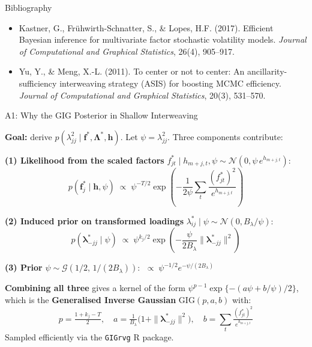 \documentclass[10pt]{beamer}\usepackage[]{graphicx}\usepackage[table]{xcolor}
\begin{document}

\appendix

\begin{frame}{Bibliography}
  \begin{itemize}
    \setlength\itemsep{1em}
    \item Kastner, G., Fr\"{u}hwirth-Schnatter, S., \& Lopes, H.F. (2017).
          Efficient Bayesian inference for multivariate factor stochastic
          volatility models. \textit{Journal of Computational and Graphical
          Statistics}, 26(4), 905--917.
    \item Yu, Y., \& Meng, X.-L. (2011). To center or not to center:
          An ancillarity-sufficiency interweaving strategy (ASIS) for
          boosting MCMC efficiency. \textit{Journal of Computational and
          Graphical Statistics}, 20(3), 531--570.
  \end{itemize}
\end{frame}


\begin{frame}{A1: Why the GIG Posterior in Shallow Interweaving}

  \textbf{Goal:} derive $p(\lambda_{jj}^2 \mid \mathbf{f}^*, \boldsymbol{\Lambda}^*, \mathbf{h})$.
  Let $\psi = \lambda_{jj}^2$.  Three components contribute:

  \vspace{0.3em}

  \textbf{(1) Likelihood from the scaled factors}
  $f_{jt}^* \mid h_{m+j,t}, \psi \sim \mathcal{N}(0, \psi\, e^{h_{m+j,t}})$:
  \[
    p(\mathbf{f}_j^* \mid \mathbf{h}, \psi)
    \;\propto\; \psi^{-T/2}
    \exp\!\left(-\frac{1}{2\psi}\sum_t \frac{(f_{jt}^*)^2}{e^{h_{m+j,t}}}\right)
  \]

  \textbf{(2) Induced prior on transformed loadings}
  $\lambda^*_{ij} \mid \psi \sim \mathcal{N}(0, B_\lambda/\psi)$:
  \[
    p(\boldsymbol{\lambda}^*_{-jj} \mid \psi)
    \;\propto\; \psi^{k_j/2}
    \exp\!\left(-\frac{\psi}{2B_\lambda}\|\boldsymbol{\lambda}^*_{-jj}\|^2\right)
  \]

  \textbf{(3) Prior} $\psi \sim \mathcal{G}(1/2,\, 1/(2B_\lambda))$:
  $\;\propto\; \psi^{-1/2} e^{-\psi/(2B_\lambda)}$

  \vspace{0.3em}

  \textbf{Combining all three} gives a kernel of the form
  $\psi^{p-1}\exp\{-(a\psi + b/\psi)/2\}$, which is the
  \textbf{Generalised Inverse Gaussian} $\mathrm{GIG}(p,a,b)$ with:
  \[
    p = \tfrac{1+k_j-T}{2}, \quad
    a = \tfrac{1}{B_\lambda}\bigl(1+\|\boldsymbol{\lambda}^*_{-jj}\|^2\bigr), \quad
    b = \sum_t \tfrac{(f_{jt}^*)^2}{e^{h_{m+j,t}}}
  \]
  Sampled efficiently via the \texttt{GIGrvg} R package.

\end{frame}
\end{document}
